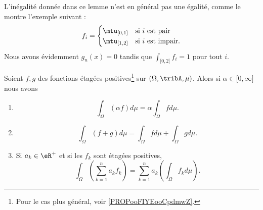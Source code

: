 L'inégalité donnée dans ce lemme n'est en général pas une égalité, comme le montre l'exemple suivant :
\begin{equation}
	f_i=\begin{cases}
		\mtu_{\mathopen[ 0 , 1 \mathclose]} & \text{si } i\text{ est pair}    \\
		\mtu_{\mathopen[ 1 , 2 \mathclose]} & \text{si } i\text{ est impair}.
	\end{cases}
\end{equation}
Nous avons évidemment \( g_n(x)=0\) tandis que \( \int_{\mathopen[ 0 , 2 \mathclose]}f_i=1\) pour tout \( i\).

\begin{theorem}        \label{ThoooCZCXooVvNcFD}
	Soient \( f,g\) des fonctions étagées positives\footnote{Pour le cas plus général, voir \ref{PROPooFIYEooCpdmwZ}.} sur \( (\Omega,\tribA,\mu)\). Alors si \( \alpha\in\mathopen[ 0 , \infty \mathclose]\) nous avons
	\begin{enumerate}
		\item
		      \begin{equation}
			      \int_{\Omega}(\alpha f)d\mu=\alpha\int_{\Omega}fd\mu.
		      \end{equation}
		\item       \label{ITEMooBLEVooDznQTY}
		      \begin{equation}
			      \int_{\Omega}(f+g)d\mu=\int_{\Omega}fd\mu+\int_{\Omega}gd\mu.
		      \end{equation}
		      \item\label{ITEMooOJRAooQkoQyD}
		      Si \( a_k\in \eR^+\) et si les \( f_k\) sont étagées positives,
		      \begin{equation}
			      \int_{\Omega}\left( \sum_{k=1}^na_kf_k \right)=\sum_{k=1}^na_k\left( \int_{\Omega} f_kd\mu \right).
		      \end{equation}
	\end{enumerate}
\end{theorem}


